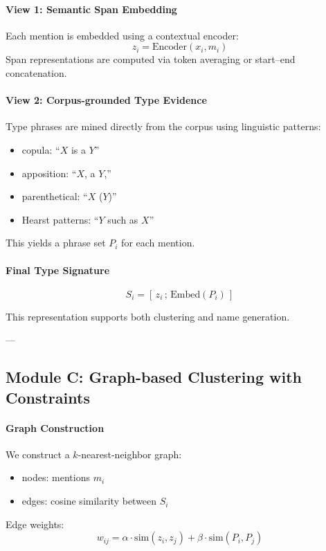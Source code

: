 \documentclass[14pt]{extreport}
\begin{document}
\paragraph{View 1: Semantic Span Embedding}
Each mention is embedded using a contextual encoder:
\[
z_i = \text{Encoder}(x_i, m_i)
\]
Span representations are computed via token averaging or start--end concatenation.

\paragraph{View 2: Corpus-grounded Type Evidence}
Type phrases are mined directly from the corpus using linguistic patterns:
\begin{itemize}
    \item copula: ``$X$ is a $Y$''
    \item apposition: ``$X$, a $Y$,''
    \item parenthetical: ``$X$ ($Y$)''
    \item Hearst patterns: ``$Y$ such as $X$''
\end{itemize}

This yields a phrase set $P_i$ for each mention.

\paragraph{Final Type Signature}
\[
S_i = [\, z_i \,;\, \text{Embed}(P_i) \,]
\]

This representation supports both clustering and name generation.

---

\subsection{Module C: Graph-based Clustering with Constraints}

\paragraph{Graph Construction}
We construct a $k$-nearest-neighbor graph:
\begin{itemize}
    \item nodes: mentions $m_i$
    \item edges: cosine similarity between $S_i$
\end{itemize}

Edge weights:
\[
w_{ij} = \alpha \cdot \text{sim}(z_i,z_j)
       + \beta \cdot \text{sim}(P_i,P_j)
\]
\end{document}
